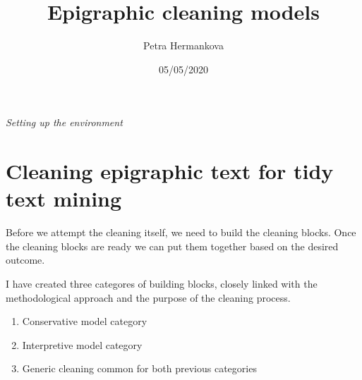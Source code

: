 \documentclass[]{article}
\title{Epigraphic cleaning models}
\author{Petra Hermankova}
\date{05/05/2020}
\newenvironment{Shaded}{\begin{snugshade}}{\end{snugshade}}
\newcommand{\CommentTok}[1]{\textcolor[rgb]{0.56,0.35,0.01}{\textit{#1}}}
\newcommand{\DataTypeTok}[1]{\textcolor[rgb]{0.13,0.29,0.53}{#1}}
\newcommand{\KeywordTok}[1]{\textcolor[rgb]{0.13,0.29,0.53}{\textbf{#1}}}
\newcommand{\NormalTok}[1]{#1}
\newcommand{\OperatorTok}[1]{\textcolor[rgb]{0.81,0.36,0.00}{\textbf{#1}}}
\newcommand{\OtherTok}[1]{\textcolor[rgb]{0.56,0.35,0.01}{#1}}
\newcommand{\StringTok}[1]{\textcolor[rgb]{0.31,0.60,0.02}{#1}}
\providecommand{\tightlist}{%
  \setlength{\itemsep}{0pt}\setlength{\parskip}{0pt}}
\begin{document}
\maketitle

\emph{Setting up the environment}

\begin{Shaded}
\end{Shaded}

\hypertarget{cleaning-epigraphic-text-for-tidy-text-mining}{%
\section{Cleaning epigraphic text for tidy text
mining}\label{cleaning-epigraphic-text-for-tidy-text-mining}}

Before we attempt the cleaning itself, we need to build the cleaning
blocks. Once the cleaning blocks are ready we can put them together
based on the desired outcome.

I have created three categores of building blocks, closely linked with
the methodological approach and the purpose of the cleaning process.

\begin{enumerate}
\def\labelenumi{\arabic{enumi}.}
\tightlist
\item
  Conservative model category
\item
  Interpretive model category
\item
  Generic cleaning common for both previous categories
\end{enumerate}
\end{document}
